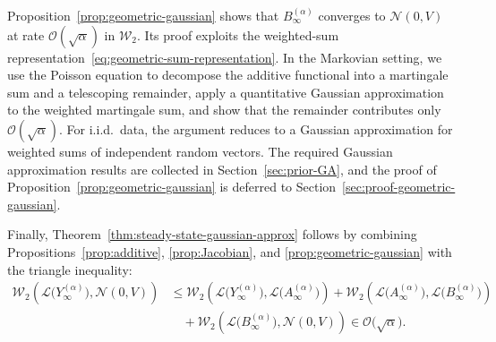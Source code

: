 \documentclass[11pt,letterpaper]{article}
\theoremstyle{plain}
\theoremstyle{definition}
\theoremstyle{remark}
\newcommand{\W}{\mathcal{W}}
\newcommand{\law}{\mathcal{L}}
\begin{document}
Proposition~\ref{prop:geometric-gaussian} shows that
\(B_\infty^{(\alpha)}\) converges to \(\mathcal N(0,V)\) at rate
\(\mathcal O(\sqrt{\alpha})\) in \(\W_2\). Its proof exploits the weighted-sum
representation~\eqref{eq:geometric-sum-representation}. In the Markovian
setting, we use the Poisson equation to decompose the additive functional into
a martingale sum and a telescoping remainder, apply a quantitative Gaussian
approximation to the weighted martingale sum, and show that the remainder
contributes only \(\mathcal O(\sqrt{\alpha})\). For i.i.d.\ data, the argument
reduces to a Gaussian approximation for weighted sums of independent random
vectors. The required Gaussian approximation results are collected in
Section~\ref{sec:prior-GA}, and the proof of
Proposition~\ref{prop:geometric-gaussian} is deferred to
Section~\ref{sec:proof-geometric-gaussian}.

Finally, Theorem~\ref{thm:steady-state-gaussian-approx} follows by combining
Propositions~\ref{prop:additive}, \ref{prop:Jacobian}, and
\ref{prop:geometric-gaussian} with the triangle inequality:
\begin{align*}
\W_2\left(
    \law\bigl(Y_\infty^{(\alpha)}\bigr),
    \mathcal N(0,V)
\right)
&\leq
\W_2\left(
    \law\bigl(Y_\infty^{(\alpha)}\bigr),
    \law\bigl(A_\infty^{(\alpha)}\bigr)
\right) +
\W_2\left(
    \law\bigl(A_\infty^{(\alpha)}\bigr),
    \law\bigl(B_\infty^{(\alpha)}\bigr)
\right) \\
&\quad+
\W_2\left(
    \law\bigl(B_\infty^{(\alpha)}\bigr),
    \mathcal N(0,V)
\right)
\in 
\mathcal O\bigl(\sqrt{\alpha}\bigr).
\end{align*}
\end{document}
